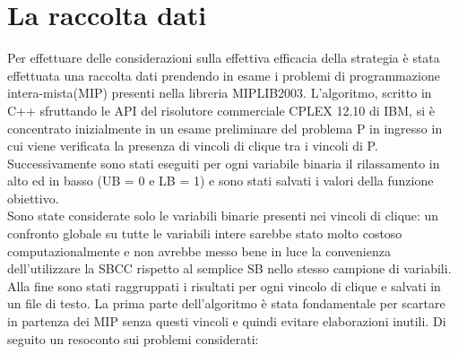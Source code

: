 \documentclass[12pt,a4paper,twoside,openright]{book}
\begin{document}
\section{La raccolta dati}
Per effettuare delle considerazioni sulla effettiva efficacia della strategia è stata effettuata 
una raccolta dati prendendo in esame i problemi di programmazione intera-mista(MIP) presenti
nella libreria MIPLIB2003. L’algoritmo, scritto in C++ sfruttando le API del risolutore 
commerciale CPLEX 12.10 di IBM, si è concentrato inizialmente in un esame preliminare del 
problema P in ingresso in cui viene verificata la presenza di vincoli di clique tra i vincoli di P. 
Successivamente sono stati eseguiti per ogni variabile binaria il rilassamento in alto ed in basso 
(UB  = 0 e LB = 1) e sono stati salvati i valori della funzione obiettivo. \\
Sono state considerate solo le variabili binarie presenti nei vincoli di clique: un confronto globale
su tutte le variabili intere sarebbe stato molto costoso computazionalmente e non avrebbe messo bene 
in luce la convenienza dell'utilizzare la SBCC rispetto al semplice SB nello stesso campione di variabili.\\
Alla fine sono stati raggruppati i risultati per ogni vincolo di clique e salvati in un file di testo. 
La prima parte dell’algoritmo è stata fondamentale per scartare in partenza dei MIP senza 
questi vincoli e quindi evitare elaborazioni inutili.
\clearpage
\pagebreak 
Di seguito un resoconto sui problemi considerati:
\end{document}
